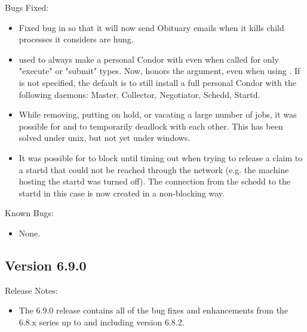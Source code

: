 \noindent Bugs Fixed:

\begin{itemize}

\item Fixed bug in  so that it will now send Obituary
emails when it kills child processes it considers are hung.

\item {} used to always make a personal Condor with
 even when  called for only "execute" or
"submit" types.  Now,  honors the 
argument, even when using .
If  is not specified, the default is to still install a
full personal Condor with the following daemons: Master, Collector,
Negotiator, Schedd, Startd. 

\item While removing, putting on hold, or vacating a large number of
jobs, it was possible for  and  to
temporarily deadlock with each other.  This has been solved under unix,
but not yet under windows.

\item It was possible for  to block until timing out
when trying to release a claim to a startd that could not be reached
through the network (e.g. the machine hosting the startd was turned
off).  The connection from the schedd to the startd in this case is
now created in a non-blocking way.

\end{itemize}

\noindent Known Bugs:

\begin{itemize}

\item None.

\end{itemize}

\subsection*{\label{sec:New-6-9-0}Version 6.9.0}

\noindent Release Notes:

\begin{itemize}

\item The 6.9.0 release contains all of the bug fixes and enhancements
  from the 6.8.x series up to and including version 6.8.2.


\end{itemize}


